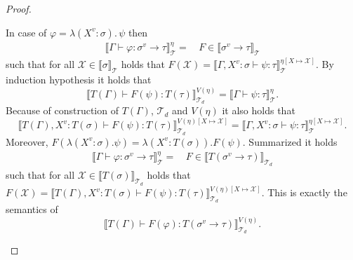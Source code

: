 \begin{proof}
\begin{compactitem}
        \item In case of $\varphi = \lambda(X^v \colon \sigma).\,\psi$ then
        \begin{align*}
            \llbracket \Gamma \vdash \varphi \colon \sigma^v \rightarrow \tau \rrbracket^\eta_\mathcal{T} =&\,F \in
            \llbracket \sigma^v \rightarrow \tau \rrbracket_\mathcal{T}
        \end{align*}
        such that for all $\mathcal{X} \in \llbracket \sigma \rrbracket_\mathcal{T}$ holds that $F(\mathcal{X}) =
        \llbracket \Gamma, X^v \colon \sigma \vdash \psi \colon \tau \rrbracket^{\eta[X \mapsto
        \mathcal{X}]}_\mathcal{T}$.
        By induction hypothesis it holds that \[\llbracket T(\Gamma) \vdash F(\psi) \colon T
        (\tau) \rrbracket^{V(\eta)}_{\mathcal{T}_d} = \llbracket \Gamma
        \vdash \psi \colon \tau \rrbracket^\eta_\mathcal{T}.\]
        Because of construction of $T(\Gamma)$, $\mathcal{T}_d$ and $V(\eta)$ it also holds that
        \[\llbracket T(\Gamma), X^v \colon T(\sigma) \vdash F(\psi) \colon T
        (\tau) \rrbracket^{V(\eta)[X \mapsto \mathcal{X}]}_{\mathcal{T}_d} = \llbracket \Gamma, X^v \colon \sigma
        \vdash \psi \colon \tau \rrbracket^{\eta[X \mapsto \mathcal{X}]}_\mathcal{T}.\]
        Moreover, $F(\lambda(X^v \colon \sigma).\psi) = \lambda(X^v \colon T(\sigma)).F(\psi)$. Summarized it holds
        \begin{align*}
            \llbracket \Gamma \vdash \varphi \colon \sigma^v \rightarrow \tau \rrbracket^\eta_\mathcal{T} =&\,F \in
            \llbracket T(\sigma^v \rightarrow \tau) \rrbracket_{\mathcal{T}_d}
        \end{align*}
        such that for all $\mathcal{X} \in \llbracket T(\sigma) \rrbracket_{\mathcal{T}_d}$ holds that $F(\mathcal{X}) =
        \llbracket T(\Gamma), X^v \colon T(\sigma) \vdash F(\psi) \colon T(\tau) \rrbracket^{V(\eta)[X \mapsto
        \mathcal{X}]}_{\mathcal{T}_d}$.
        This is exactly the semantics of
        \[\llbracket T(\Gamma) \vdash F(\varphi) \colon T(\sigma^v \rightarrow \tau) \rrbracket^{V(\eta)
        }_{\mathcal{T}_d}.\]


\end{compactitem}
\end{proof}
